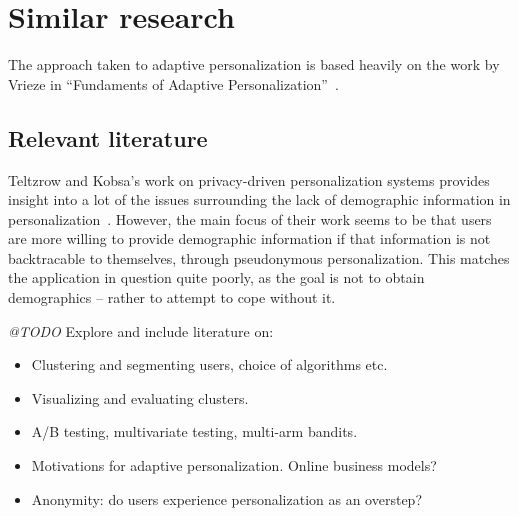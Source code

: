 \section{Similar research} %
\label{sec:similar_applications}

The approach taken to adaptive personalization is based heavily on the work by Vrieze in ``Fundaments of Adaptive Personalization''~\cite{Vrieze}.

\subsection{Relevant literature} %
\label{sub:relevant_literature}

Teltzrow and Kobsa's work on privacy-driven personalization systems provides insight into a lot of the issues surrounding the lack of demographic information in personalization~\cite{Teltzrow2004,Kobsa2007}. However, the main focus of their work seems to be that users are more willing to provide demographic information if that information is not backtracable to themselves, through pseudonymous personalization.
This matches the application in question quite poorly, as the goal is not to obtain demographics -- rather to attempt to cope without it.

\emph{@TODO} Explore and include literature on:

\begin{itemize}
  \item Clustering and segmenting users, choice of algorithms etc.
  \item Visualizing and evaluating clusters.
  \item A/B testing, multivariate testing, multi-arm bandits.
  \item Motivations for adaptive personalization. Online business models?
  \item Anonymity: do users experience personalization as an overstep?
\end{itemize}


